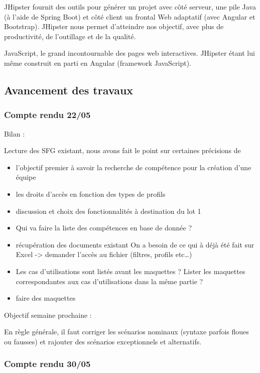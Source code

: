 JHipster fournit des outils pour générer un projet avec côté serveur, une pile Java (à l'aide de Spring Boot) et côté client un frontal Web adaptatif (avec Angular et Bootstrap).
JHipster nous permet d'atteindre nos objectif, avec plus de productivité, de l'outillage et de la qualité.

JavaScript, le grand incontournable des pages web interactives. JHipster étant lui même construit en parti en Angular (framework JavaScript).

\subsection{Avancement des travaux}
\subsubsection{Compte rendu 22/05}

Bilan :

Lecture des SFG existant, nous avons fait le point sur certaines précisions de
\begin{itemize}
\item l’objectif premier à savoir la recherche de compétence pour la création d’une équipe
\item les droits d’accès en fonction des types de profils
\item discussion et choix des fonctionnalités à destination du lot 1
\item Qui va faire la liste des compétences en base de donnée ?
\item récupération des documents existant On a besoin de ce qui à déjà été fait sur Excel -> demander l’accès au fichier (filtres, profils etc…)
\item Les cas d'utilisations sont listés avant les maquettes ? Lister les maquettes correspondantes aux cas d'utilisations dans la même partie ?
\item faire des maquettes 
\end{itemize}


Objectif semaine prochaine :

En règle générale, il faut corriger les scénarios nominaux (syntaxe parfois floues ou fausses) et rajouter des scénarios exceptionnels et alternatifs.

\subsubsection{Compte rendu 30/05}

